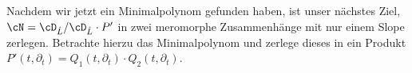 \begin{comment}
\begin{bem}
Alternativ ließe sich ein Minimalpolynom von $\cN$ mit der Formel aus Lemma
\ref{lem:twistRechenregel} berechnen. Denn mit
$\rho^*P(t,\partial_t)=t^4\partial_t^2-t^3\partial_t+2a$, ist
\begin{align*}
\rho^*P(t,\partial_t-\frac{\partial \psi}{\partial t})
&=\rho^*P(t,\partial_t-\frac{-i\sqrt{2a}}{t^2})
\\&= t^4\myubracket{(\partial_t+\frac{i\sqrt{2a}}{t^2})^2}
    \myubracket{- t^3(\partial_t+\frac{i\sqrt{2a}}{t^2})} + 2a
\\&= t^4 \myobracket{\myubracket{
      (\partial_t+i\sqrt{2a}t^{-2})(\partial_t+i\sqrt{2a}t^{-2})
    }} \myobracket{ - t^3\partial_t - i\sqrt{2a}t} + 2a
\\&= t^4 \myobracket{ (\partial_t^2 + i\sqrt{2a}t^{-2}\partial_t
      +\partial_ti\sqrt{2a}t^{-2} + \myubracket{(i\sqrt{2a}t^{-2})^2)}
    } - t^3\partial_t - i\sqrt{2a}t + 2a
\\&= t^4\partial_t^2 + i\sqrt{2a}t^{2}\partial_t
    + i\sqrt{2a}t^4\myubracket{\partial_tt^{-2}} \myobracket{-2at^{-4}}t^4
    - t^3\partial_t
    - i\sqrt{2a}t + 2a
\\&= t^4\partial_t^2 + i\sqrt{2a}t^{2}\partial_t
    + i\sqrt{2a}t^4\myobracket{(t^{-2}\partial_t-2t^{-3})} - t^3\partial_t
    - i\sqrt{2a}t
\\&= t^4\partial_t^2 + i\sqrt{2a}t^{2}\partial_t + i\sqrt{2a}t^2\partial_t
    - 2i\sqrt{2a}t - t^3\partial_t - i\sqrt{2a}t
\\&= t^4\partial_t^2 - (t^3-2i\sqrt{2a}t^{2})\partial_t - 3i\sqrt{2a}t
\\&= t^4P'(t,\partial_t)
\end{align*}
\end{bem}
\end{comment}

Nachdem wir jetzt ein Minimalpolynom gefunden haben, ist unser nächstes Ziel,
$\cN=\cD_{\hat L}/\cD_{\hat L}\cdot P'$ in zwei meromorphe Zusammenhänge mit
nur einem Slope zerlegen.  Betrachte hierzu das Minimalpolynom und zerlege
dieses in ein Produkt $P'(t,\partial_t)=Q_1(t,\partial_t)\cdot
Q_2(t,\partial_t)$.

